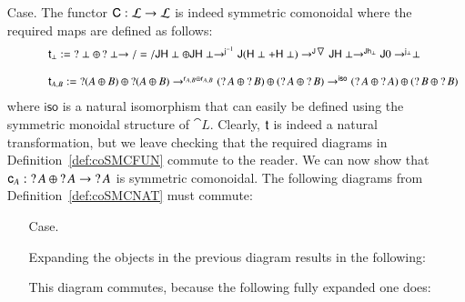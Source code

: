 \begin{itemize}
  \item[Case.] The functor $\func{C} : \cat{L} \mto \cat{L}$ is indeed
    symmetric comonoidal where the required maps are defined as follows:
    \[
    \small
    \begin{array}{lll}
      \quad\quad\quad\t_\perp := \wn \perp \oplus \wn \perp \mto/=/ \J\H\perp \oplus \J\H\perp \mto^{\jinv{}} \J(\H\perp + \H\perp) \mto^{\J\codiag{}} \J\H\perp \mto^{\J\h{\perp}} \J 0 \mto^{\j{\perp}} \perp\\
      \\
      \quad\quad\quad\t_{A,B} := \wn (A \oplus B) \oplus \wn (A \oplus B) \mto^{\r{A,B} \oplus \r{A,B}} (\wn A \oplus \wn B) \oplus (\wn A \oplus \wn B) \mto^{\iso} (\wn A \oplus \wn A) \oplus (\wn B \oplus \wn B)
    \end{array}
    \]
    where $\mathsf{iso}$ is a natural isomorphism that can easily be
    defined using the symmetric monoidal structure of
    $\cat{L}$. Clearly, $\t$ is indeed a natural transformation, but
    we leave checking that the required diagrams in
    Definition~\ref{def:coSMCFUN} commute to the reader.  We can now
    show that $\c{A} : \wn A \oplus \wn A \mto \wn A$ is symmetric
    comonoidal.  The following diagrams from
    Definition~\ref{def:coSMCNAT} must commute:
    \begin{itemize}
    \item[Case.] \ \\
      \begin{diagram}
      \end{diagram}
      Expanding the objects in the previous diagram results in the following:
      \begin{diagram}
      \end{diagram}
      This diagram commutes, because the following fully expanded one
      does:
      \begin{center}
\end{center}
\end{itemize}
\end{itemize}
